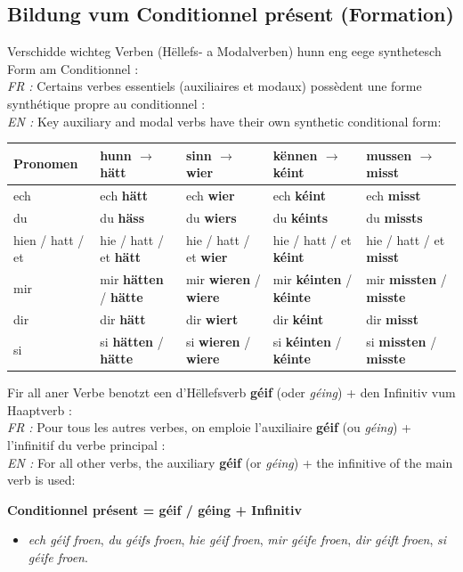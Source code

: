 \subsection*{Bildung vum Conditionnel présent (Formation)}

Verschidde wichteg Verben (Hëllefs- a Modalverben) hunn eng eege synthetesch Form am Conditionnel : \\
\textit{FR :} Certains verbes essentiels (auxiliaires et modaux) possèdent une forme synthétique propre au conditionnel : \\
\textit{EN :} Key auxiliary and modal verbs have their own synthetic conditional form:

\begin{center}
\small
\setlength{\tabcolsep}{4pt}
\begin{tabular}{lllll}
\toprule
\textbf{Pronomen} & \textbf{hunn $\rightarrow$ hätt} & \textbf{sinn $\rightarrow$ wier} & \textbf{kënnen $\rightarrow$ kéint} & \textbf{mussen $\rightarrow$ misst} \\
\midrule
ech & ech \textbf{hätt} & ech \textbf{wier} & ech \textbf{kéint} & ech \textbf{misst} \\
du & du \textbf{häss} & du \textbf{wiers} & du \textbf{kéints} & du \textbf{missts} \\
hien / hatt / et & hie / hatt / et \textbf{hätt} & hie / hatt / et \textbf{wier} & hie / hatt / et \textbf{kéint} & hie / hatt / et \textbf{misst} \\
mir & mir \textbf{hätten} / \textbf{hätte} & mir \textbf{wieren} / \textbf{wiere} & mir \textbf{kéinten} / \textbf{kéinte} & mir \textbf{missten} / \textbf{misste} \\
dir & dir \textbf{hätt} & dir \textbf{wiert} & dir \textbf{kéint} & dir \textbf{misst} \\
si & si \textbf{hätten} / \textbf{hätte} & si \textbf{wieren} / \textbf{wiere} & si \textbf{kéinten} / \textbf{kéinte} & si \textbf{missten} / \textbf{misste} \\
\bottomrule
\end{tabular}
\end{center}

\vspace{0.5em}

Fir all aner Verbe benotzt een d'Hëllefsverb \textbf{géif} (oder \textit{géing}) + den Infinitiv vum Haaptverb : \\
\textit{FR :} Pour tous les autres verbes, on emploie l'auxiliaire \textbf{géif} (ou \textit{géing}) + l'infinitif du verbe principal : \\
\textit{EN :} For all other verbs, the auxiliary \textbf{géif} (or \textit{géing}) + the infinitive of the main verb is used:
\begin{center}
\textbf{Conditionnel présent = géif / géing + Infinitiv}
\end{center}
\begin{itemize}
    \item \textit{ech géif froen}, \textit{du géifs froen}, \textit{hie géif froen}, \textit{mir géife froen}, \textit{dir géift froen}, \textit{si géife froen}.
\end{itemize}

